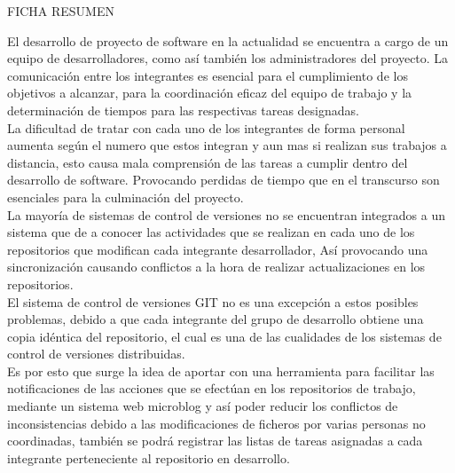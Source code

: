 \begin{titlepage}

\begin{center}
 {\Large FICHA RESUMEN}\\
\end{center}

El desarrollo de proyecto de software en la actualidad se encuentra a cargo de un equipo de desarrolladores, como así también los administradores del proyecto.
La comunicación entre los integrantes es esencial para el cumplimiento de los objetivos a alcanzar, para la coordinación eficaz del equipo de trabajo y la determinación de tiempos para las respectivas tareas designadas.\\

La dificultad de tratar con cada uno de los integrantes de forma personal aumenta según el numero que estos integran y aun mas si realizan sus trabajos a distancia, esto causa mala comprensión de las tareas a cumplir dentro del desarrollo de software. Provocando perdidas de tiempo que en el transcurso son esenciales para la culminación del proyecto.\\

La mayoría de sistemas de control de versiones no se encuentran integrados a un sistema que de a conocer las actividades que se realizan en cada uno de los repositorios que modifican cada integrante desarrollador, Así provocando una sincronización causando conflictos a la hora de realizar actualizaciones en los repositorios.\\
El sistema de control de versiones GIT no es una excepción a estos posibles problemas, debido a que cada integrante del grupo de desarrollo obtiene una copia idéntica del repositorio, el cual es una de las cualidades de los sistemas de control de versiones distribuidas.\\

Es por esto que surge la idea de aportar con una herramienta para facilitar las notificaciones de las acciones que se efectúan en los repositorios de trabajo, mediante un sistema web microblog y así poder reducir los conflictos de inconsistencias debido a las modificaciones de ficheros por varias personas no coordinadas, también se podrá registrar las listas de tareas asignadas a cada integrante 
perteneciente al repositorio en desarrollo.


\end{titlepage}